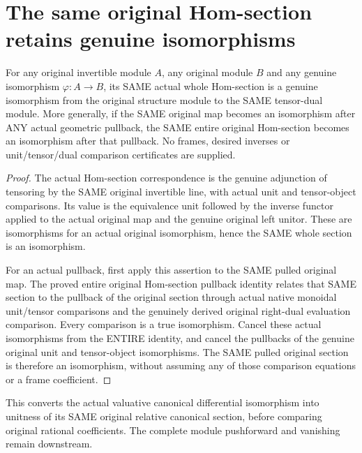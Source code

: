 \section{The same original Hom-section retains genuine isomorphisms}
\label{sec:scheme-invertible-hom-section-isomorphism}

\begin{theorem}
\label{sc0-hom-section-iso:whole-map}
\leanok
For any original invertible module $A$, any original module $B$ and
any genuine isomorphism $\varphi:A\to B$, its SAME actual whole
Hom-section is a genuine isomorphism from the original structure
module to the SAME tensor-dual module. More generally, if the SAME
original map becomes an isomorphism after ANY actual geometric
pullback, the SAME entire original Hom-section becomes an
isomorphism after that pullback. No frames, desired inverses or
unit/tensor/dual comparison certificates are supplied.
\end{theorem}
\begin{proof}
The actual Hom-section correspondence is the genuine adjunction of
tensoring by the SAME original invertible line, with actual unit
and tensor-object comparisons. Its value is the equivalence unit
followed by the inverse functor applied to the actual original map
and the genuine original left unitor. These are isomorphisms for
an actual original isomorphism, hence the SAME whole section is
an isomorphism.

For an actual pullback, first apply this assertion to the SAME
pulled original map. The proved entire original
Hom-section pullback identity relates that SAME section to the
pullback of the original section through actual native monoidal
unit/tensor comparisons and the genuinely derived original
right-dual evaluation comparison. Every comparison is a true
isomorphism. Cancel these actual isomorphisms from the ENTIRE
identity, and cancel the pullbacks of the genuine original unit
and tensor-object isomorphisms. The SAME pulled original section
is therefore an isomorphism, without assuming any of those
comparison equations or a frame coefficient.
\end{proof}

This converts the actual valuative canonical differential
isomorphism into unitness of its SAME original relative canonical
section, before comparing original rational coefficients. The
complete module pushforward and vanishing remain downstream.

